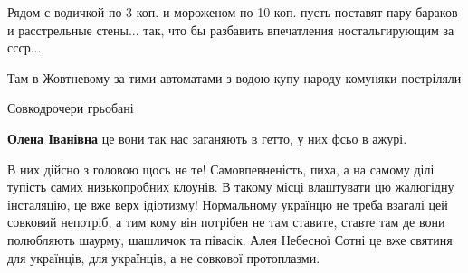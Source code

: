 \begin{itemize}
Рядом с водичкой по 3 коп. и мороженом по 10 коп. пусть поставят пару бараков и
расстрельные стены... так, что бы разбавить впечатления ностальгирующим за
ссср...

\begin{itemize}
 
Там в Жовтневому за тими автоматами з водою купу народу комуняки постріляли
\end{itemize}

 
Совкодрочери грьобані

\begin{itemize}
 
\textbf{Олена Іванівна} це вони так нас заганяють в гетто, у них фсьо в ажурі.
\end{itemize}

 

В них дійсно з головою щось не те! Самовпевненість, пиха, а на самому ділі
тупість самих низькопробних клоунів. В такому місці влаштувати цю жалюгідну
інсталяцію, це вже верх ідіотизму! Нормальному українцю не треба взагалі цей
совковий непотріб, а тим кому він потрібен не там ставите, ставте там де вони
полюбляють шаурму, шашличок та півасік. Алея Небесної Сотні це вже святиня для
українців, для українців, а не совкової протоплазми.


 


\end{itemize}
